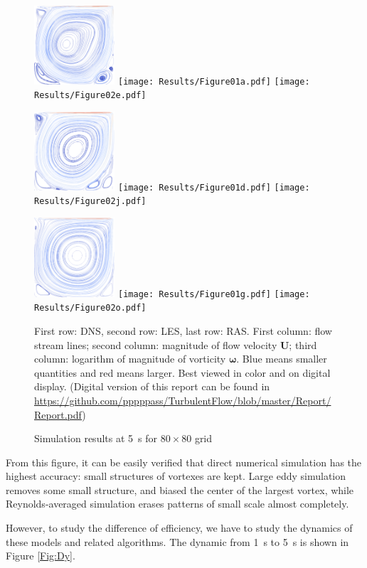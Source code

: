 \documentclass[english, nochinese]{pkupaper}
\begin{document}
\begin{figure}[htbp]
{
\centering
{
\includegraphics[width=3cm]{Results/Figure01b.pdf}
\texttt{[image: Results/Figure01a.pdf]}
\texttt{[image: Results/Figure02e.pdf]}
}

{
\includegraphics[width=3cm]{Results/Figure01e.pdf}
\texttt{[image: Results/Figure01d.pdf]}
\texttt{[image: Results/Figure02j.pdf]}
}

{
\includegraphics[width=3cm]{Results/Figure01h.pdf}
\texttt{[image: Results/Figure01g.pdf]}
\texttt{[image: Results/Figure02o.pdf]}
}
\caption{Simulation results at \SI{5}{s} for $ 80 \times 80 $ grid}
\label{Fig:Over}
}
{
\footnotesize
First row: DNS, second row: LES, last row: RAS. First column: flow stream lines; second column: magnitude of flow velocity $\mathbf{U}$; third column: logarithm of magnitude of vorticity $\bm{\omega}$. Blue means smaller quantities and red means larger. Best viewed in color and on digital display. (Digital version of this report can be found in \url{https://github.com/pppppass/TurbulentFlow/blob/master/Report/Report.pdf})
}
\end{figure}

From this figure, it can be easily verified that direct numerical simulation has the highest accuracy: small structures of vortexes are kept. Large eddy simulation removes some small structure, and biased the center of the largest vortex, while Reynolds-averaged simulation erases patterns of small scale almost completely.

However, to study the difference of efficiency, we have to study the dynamics of these models and related algorithms. The dynamic from \SI{1}{\second} to \SI{5}{\second} is shown in Figure \ref{Fig:Dy}.
\end{document}
